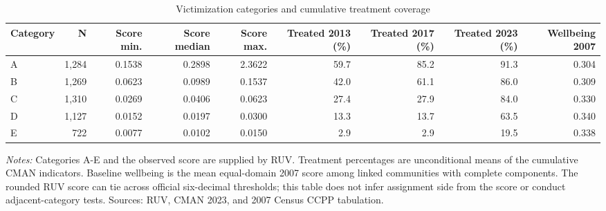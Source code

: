 \begin{table}[!htbp]
\centering
\caption{Victimization categories and cumulative treatment coverage}
\label{tab:desc_victimization_categories}
\begin{tabular}{lrrrrrrrr}
\toprule
Category & N & Score min. & Score median & Score max. & Treated 2013 (\%) & Treated 2017 (\%) & Treated 2023 (\%) & Wellbeing 2007 \\
\midrule
A & 1,284 & 0.1538 & 0.2898 & 2.3622 & 59.7 & 85.2 & 91.3 & 0.304 \\
B & 1,269 & 0.0623 & 0.0989 & 0.1537 & 42.0 & 61.1 & 86.0 & 0.309 \\
C & 1,310 & 0.0269 & 0.0406 & 0.0623 & 27.4 & 27.9 & 84.0 & 0.330 \\
D & 1,127 & 0.0152 & 0.0197 & 0.0300 & 13.3 & 13.7 & 63.5 & 0.340 \\
E & 722 & 0.0077 & 0.0102 & 0.0150 & 2.9 & 2.9 & 19.5 & 0.338 \\
\bottomrule
\end{tabular}
\parbox{0.98\linewidth}{\footnotesize \textit{Notes:} Categories A-E and the observed score are supplied by RUV. Treatment percentages are unconditional means of the cumulative CMAN indicators. Baseline wellbeing is the mean equal-domain 2007 score among linked communities with complete components. The rounded RUV score can tie across official six-decimal thresholds; this table does not infer assignment side from the score or conduct adjacent-category tests. Sources: RUV, CMAN 2023, and 2007 Census CCPP tabulation.}
\end{table}
